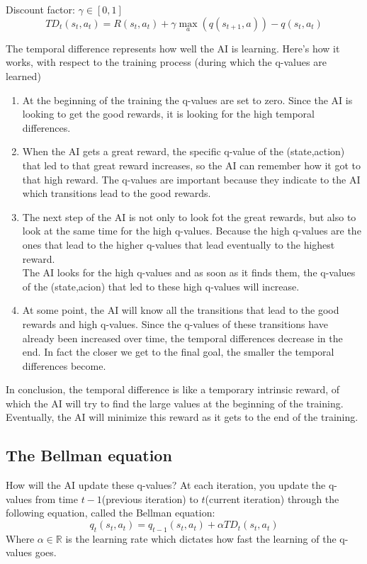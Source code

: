 \documentclass[french]{article}
\begin{document}
\begin{enumerate}
Discount factor: $\gamma \in [0,1]$\\

\[TD_t(s_t,a_t) = R(s_t,a_t) + \gamma \max_a(q(s_{t+1},a))- q(s_t,a_t)\]

The temporal difference represents how well the AI is learning. Here's how it works, with respect to the training process (during which the q-values are learned)

\begin{enumerate}
	\item At the beginning of the training the q-values are set to zero. Since the AI is looking to get the good rewards, it is looking for the high temporal differences.
	\item When the AI gets a great reward, the specific q-value of the (state,action) that led to that great reward increases, so the AI can remember how it got to that high reward. The q-values are important because they indicate to the AI which transitions lead to the good rewards.
	\item The next step of the AI is not only to look fot the great rewards, but also to look at the same time for the high q-values. Because the high q-values are the ones that lead to the higher q-values that lead eventually to the highest reward.\\
The AI looks for the high q-values and as soon as it finds them, the q-values of the (state,acion) that led to these high q-values will increase.
	\item At some point, the AI will know all the transitions that lead to the good rewards and high q-values. Since the q-values of these transitions have already been increased over time, the temporal differences decrease in the end. In fact the closer we get to the final goal, the smaller the temporal differences become.
\end{enumerate}
In conclusion, the temporal difference is like a temporary intrinsic reward, of which the AI will try to find the large values at the beginning of the training. Eventually, the AI will minimize this reward as it gets to the end of the training.

\subsection{The Bellman equation}
How will the AI update these q-values? At each iteration, you update the q-values from time $t-1$(previous iteration) to $t$(current iteration) through the following equation, called the Bellman equation:
\[q_t(s_t,a_t) = q_{t-1}(s_t,a_t) + \alpha TD_t(s_t,a_t)\]
Where $\alpha \in \mathbb{R}$ is the learning rate which dictates how fast the learning of the q-values goes.


\end{enumerate}
\end{document}
